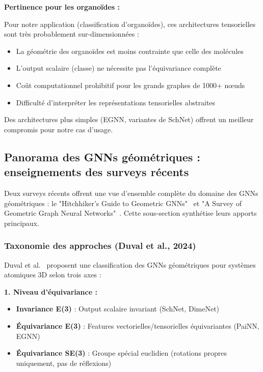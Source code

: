 \textbf{Pertinence pour les organoïdes :}

Pour notre application (classification d'organoïdes), ces architectures tensorielles sont très probablement sur-dimensionnées :
\begin{itemize}
    \item La géométrie des organoïdes est moins contrainte que celle des molécules
    \item L'output scalaire (classe) ne nécessite pas l'équivariance complète
    \item Coût computationnel prohibitif pour les grands graphes de 1000+ nœuds
    \item Difficulté d'interpréter les représentations tensorielles abstraites
\end{itemize}

Des architectures plus simples (EGNN, variantes de SchNet) offrent un meilleur compromis pour notre cas d'usage.

\subsection{Panorama des GNNs géométriques : enseignements des surveys récents}

Deux surveys récents offrent une vue d'ensemble complète du domaine des GNNs géométriques : le "Hitchhiker's Guide to Geometric GNNs"~\cite{Duval2024} et "A Survey of Geometric Graph Neural Networks"~\cite{Han2024}. Cette sous-section synthétise leurs apports principaux.

\subsubsection{Taxonomie des approches (Duval et al., 2024)}

Duval et al.~\cite{Duval2024} proposent une classification des GNNs géométriques pour systèmes atomiques 3D selon trois axes :

\textbf{1. Niveau d'équivariance :}
\begin{itemize}
    \item \textbf{Invariance E(3)} : Output scalaire invariant (SchNet, DimeNet)
    \item \textbf{Équivariance E(3)} : Features vectorielles/tensorielles équivariantes (PaiNN, EGNN)
    \item \textbf{Équivariance SE(3)} : Groupe spécial euclidien (rotations propres uniquement, pas de réflexions)
\end{itemize}


